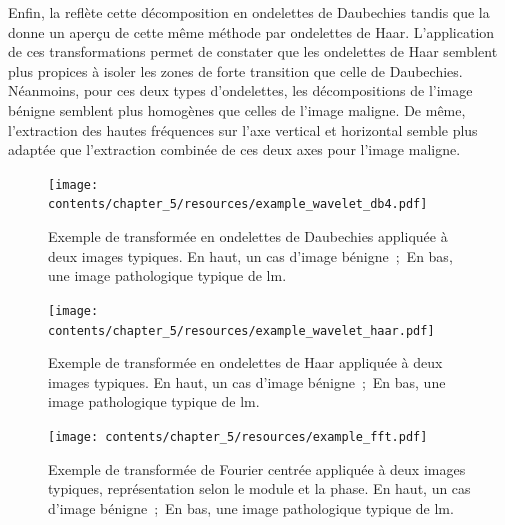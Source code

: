 Enfin, la  reflète cette décomposition en ondelettes de Daubechies tandis que la  donne un aperçu de cette même méthode par ondelettes de Haar. L'application de ces transformations permet de constater que les ondelettes de Haar semblent plus propices à isoler les zones de forte transition que celle de Daubechies. Néanmoins, pour ces deux types d'ondelettes, les décompositions de l'image bénigne semblent plus homogènes que celles de l'image maligne. De même, l'extraction des hautes fréquences sur l'axe vertical et horizontal semble plus adaptée que l'extraction combinée de ces deux axes pour l'image maligne.\par


\begin{landscape}
\begin{figure}[H]
    \centering
    \texttt{[image: contents/chapter\_5/resources/example\_wavelet\_db4.pdf]}
    \caption{Exemple de transformée en ondelettes de Daubechies appliquée à deux images typiques. En haut, un cas d'image bénigne~;~En bas, une image pathologique typique de \gls{lm}.}
    \label{fig:example_wavelet_db4}
\end{figure}\par

\begin{figure}[H]
    \centering
    \texttt{[image: contents/chapter\_5/resources/example\_wavelet\_haar.pdf]}
    \caption{Exemple de transformée en ondelettes de Haar appliquée à deux images typiques. En haut, un cas d'image bénigne~;~En bas, une image pathologique typique de \gls{lm}.}
    \label{fig:example_wavelet_haar}
\end{figure}\par

\end{landscape}

\begin{figure}[H]
    \centering
    \texttt{[image: contents/chapter\_5/resources/example\_fft.pdf]}
    \caption{Exemple de transformée de Fourier centrée appliquée à deux images typiques, représentation selon le module et la phase. En haut, un cas d'image bénigne~;~En bas, une image pathologique typique de \gls{lm}.}
    \label{fig:example_fft}
\end{figure}\par


